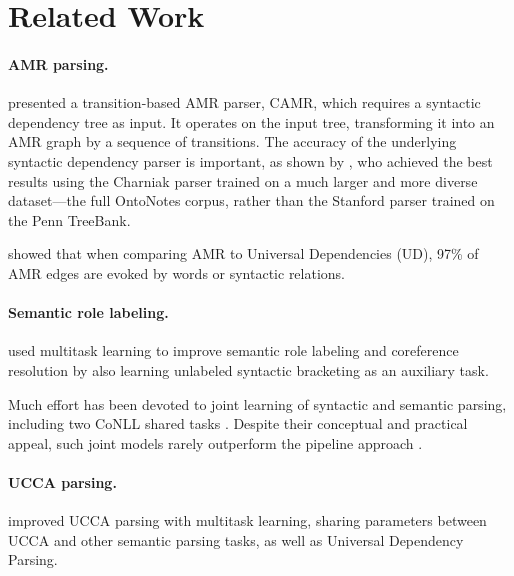 \documentclass[11pt,a4paper]{article}
\begin{document}

\section{Related Work}\label{sec:related_work}

\paragraph{AMR parsing.}

presented a transition-based AMR parser, CAMR, which requires a
syntactic dependency tree as input.
It operates on the input tree, transforming it into an AMR graph
by a sequence of transitions.
The accuracy of the underlying syntactic dependency parser is important,
as shown by ,
who achieved the best results using the Charniak parser trained on a
much larger and more diverse dataset---the full OntoNotes corpus,
rather than the Stanford parser trained on the Penn TreeBank.

 showed that when comparing AMR to Universal Dependencies (UD),
97\% of AMR edges are evoked by words or syntactic relations.

\paragraph{Semantic role labeling.}

 used multitask learning to improve semantic role labeling and coreference resolution
by also learning unlabeled syntactic bracketing as an auxiliary task.

Much effort has been devoted to joint learning of syntactic
and semantic parsing, including
two CoNLL shared tasks \cite{surdeanu2008conll,hajivc2009conll}.
Despite their conceptual and practical appeal, such joint models rarely outperform
the pipeline approach %
\cite{lluis2008joint,henderson2013multilingual,D15-1169,swayamdipta-EtAl:2016:CoNLL,swayamdipta2017frame}.

\paragraph{UCCA parsing.}

 improved UCCA parsing with multitask learning, sharing parameters
between UCCA and other semantic parsing tasks, as well as Universal Dependency Parsing.
%
%




\end{document}
